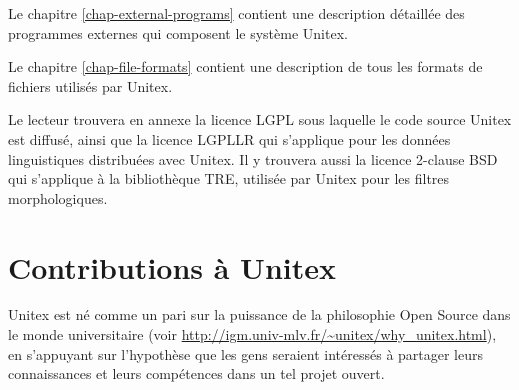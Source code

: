 \bigskip \noindent Le chapitre \ref{chap-external-programs} contient une description détaillée des
programmes externes qui composent le système Unitex.

\bigskip \noindent Le chapitre \ref{chap-file-formats} contient une description de tous les formats
de fichiers utilisés par Unitex.


\bigskip \noindent Le lecteur trouvera en annexe la licence LGPL sous  laquelle le code source
Unitex est diffusé, ainsi que la licence LGPLLR qui s'applique pour les données linguistiques
distribuées avec Unitex. Il y trouvera aussi la licence 2-clause BSD qui s'applique à la
bibliothèque TRE, utilisée par Unitex pour les filtres morphologiques.

\clearpage

\section*{Contributions à Unitex}
Unitex est né comme un pari sur la puissance de la philosophie Open Source dans le monde
universitaire (voir \url{http://igm.univ-mlv.fr/~unitex/why_unitex.html}), en s'appuyant sur l'hypothèse que les gens seraient intéressés à partager leurs connaissances et leurs compétences dans un tel projet ouvert.

